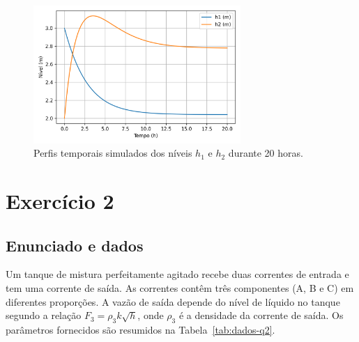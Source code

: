 \documentclass{article}
\begin{document}


\begin{figure}[h!]
  \centering
  \includegraphics[width=0.7\textwidth]{figuras/questao1_niveis.png}
  \caption{Perfis temporais simulados dos níveis $h_1$ e $h_2$ durante 20 horas.}
  \label{fig:questao1}
\end{figure}

\section{Exercício 2}

\subsection*{Enunciado e dados}
Um tanque de mistura perfeitamente agitado recebe duas correntes de entrada e tem uma corrente de saída. As correntes contêm três componentes (A, B e C) em diferentes proporções. A vazão de saída depende do nível de líquido no tanque segundo a relação $F_3 = \rho_3 k\sqrt{h}$, onde $\rho_3$ é a densidade da corrente de saída. Os parâmetros fornecidos são resumidos na Tabela~\ref{tab:dados-q2}.
\end{document}
